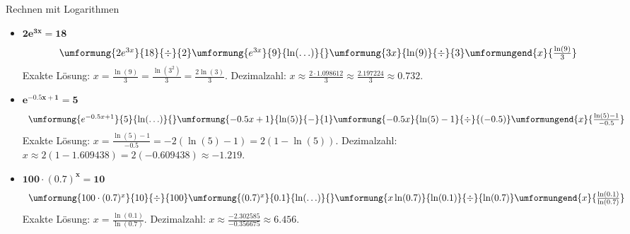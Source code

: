 \begin{loesungsumgebung}{Rechnen mit Logarithmen}
\begin{enumerate}[label=(\alph*)]
\begin{itemize}
        \item $\mathbf{2e^{3x} = 18}$
        $$
        \begin{array}{r c l c l}
        \umformung{2e^{3x}}{18}{\div}{2}
        \umformung{e^{3x}}{9}{\ln(\ldots)}{}
        \umformung{3x}{\ln(9)}{\div}{3}
        \umformungend{x}{\frac{\ln(9)}{3}}
        \end{array}
        $$
        Exakte Lösung: $x = \frac{\ln(9)}{3} = \frac{\ln(3^2)}{3} = \frac{2\ln(3)}{3}$.
        Dezimalzahl: $x \approx \frac{2 \cdot 1.098612}{3} \approx \frac{2.197224}{3} \approx \mathbf{0.732}$.

        \item $\mathbf{e^{-0.5x+1} = 5}$
        $$
        \begin{array}{r c l c l}
        \umformung{e^{-0.5x+1}}{5}{\ln(\ldots)}{}
        \umformung{-0.5x+1}{\ln(5)}{-}{1}
        \umformung{-0.5x}{\ln(5)-1}{\div}{(-0.5)}
        \umformungend{x}{\frac{\ln(5)-1}{-0.5}}
        \end{array}
        $$
        Exakte Lösung: $x = \frac{\ln(5)-1}{-0.5} = -2(\ln(5)-1) = 2(1-\ln(5))$.
        Dezimalzahl: $x \approx 2(1-1.609438) = 2(-0.609438) \approx \mathbf{-1.219}$.

        \item $\mathbf{100 \cdot (0.7)^x = 10}$
        $$
        \begin{array}{r c l c l}
        \umformung{100 \cdot (0.7)^x}{10}{\div}{100}
        \umformung{(0.7)^x}{0.1}{\ln(\ldots)}{}
        \umformung{x \ln(0.7)}{\ln(0.1)}{\div}{\ln(0.7)}
        \umformungend{x}{\frac{\ln(0.1)}{\ln(0.7)}}
        \end{array}
        $$
        Exakte Lösung: $x = \frac{\ln(0.1)}{\ln(0.7)}$.
        Dezimalzahl: $x \approx \frac{-2.302585}{-0.356675} \approx \mathbf{6.456}$.
    \end{itemize}
\end{enumerate}

\end{loesungsumgebung}



